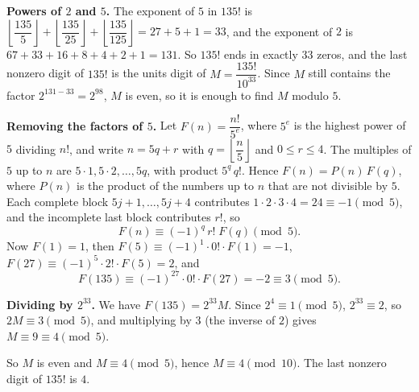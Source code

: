 \textbf{Powers of $2$ and $5$.} The exponent of $5$ in $135!$ is $\left\lfloor\dfrac{135}{5}\right\rfloor+\left\lfloor\dfrac{135}{25}\right\rfloor+\left\lfloor\dfrac{135}{125}\right\rfloor=27+5+1=33$, and the exponent of $2$ is $67+33+16+8+4+2+1=131$. So $135!$ ends in exactly $33$ zeros, and the last nonzero digit of $135!$ is the units digit of $M=\dfrac{135!}{10^{33}}$. Since $M$ still contains the factor $2^{131-33}=2^{98}$, $M$ is even, so it is enough to find $M$ modulo $5$.

\textbf{Removing the factors of $5$.} Let $F(n)=\dfrac{n!}{5^{e}}$, where $5^e$ is the highest power of $5$ dividing $n!$, and write $n=5q+r$ with $q=\left\lfloor\dfrac {n}{5}\right\rfloor$ and $0\le r\le4$. The multiples of $5$ up to $n$ are $5\cdot1,5\cdot2,\dots,5q$, with product $5^q\,q!$. Hence $F(n)=P(n)\,F(q)$, where $P(n)$ is the product of the numbers up to $n$ that are not divisible by $5$. Each complete block $5j+1,\dots,5j+4$ contributes $1\cdot2\cdot3\cdot4=24\equiv-1\pmod5$, and the incomplete last block contributes $r!$, so
\[
F(n)\equiv(-1)^{q}\,r!\;F(q)\pmod5 .
\]
Now $F(1)=1$, then $F(5)\equiv(-1)^1\cdot0!\cdot F(1)=-1$, $F(27)\equiv(-1)^5\cdot2!\cdot F(5)=2$, and
\[
F(135)\equiv(-1)^{27}\cdot0!\cdot F(27)=-2\equiv3\pmod5 .
\]

\textbf{Dividing by $2^{33}$.} We have $F(135)=2^{33}M$. Since $2^4\equiv1\pmod5$, $2^{33}\equiv2$, so $2M\equiv3\pmod5$, and multiplying by $3$ (the inverse of $2$) gives $M\equiv9\equiv4\pmod5$.

So $M$ is even and $M\equiv4\pmod5$, hence $M\equiv4\pmod{10}$. The last nonzero digit of $135!$ is $\boxed{4}$.
